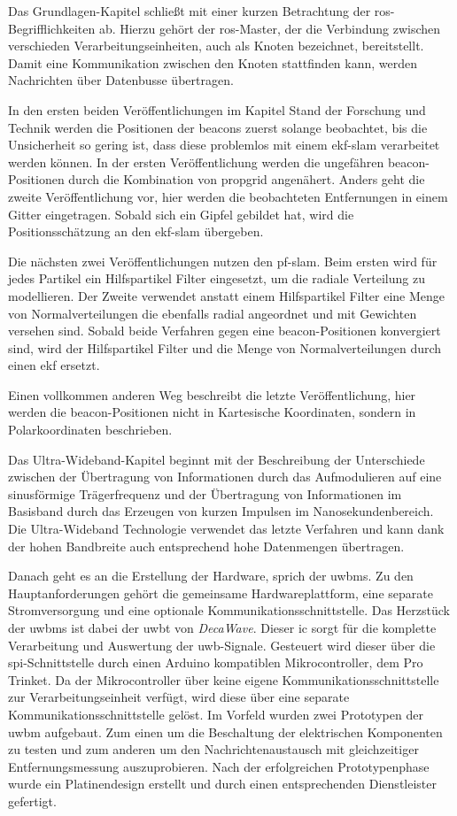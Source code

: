 Das Grundlagen-Kapitel schließt mit einer kurzen Betrachtung der \gls{ros}-Begrifflichkeiten ab. Hierzu gehört der \gls{ros}-Master, der die Verbindung zwischen verschieden Verarbeitungseinheiten, auch als Knoten bezeichnet, bereitstellt. Damit eine Kommunikation zwischen den Knoten stattfinden kann, werden Nachrichten über Datenbusse übertragen.

In den ersten beiden Veröffentlichungen im Kapitel Stand der Forschung und Technik werden die Positionen der \glspl{beacon} zuerst solange beobachtet, bis die Unsicherheit so gering ist, dass diese problemlos mit einem \gls{ekf}-\gls{slam} verarbeitet werden können. In der ersten Veröffentlichung werden die ungefähren \gls{beacon}-Positionen durch die Kombination von \gls{propgrid} angenähert. Anders geht die zweite Veröffentlichung vor, hier werden die beobachteten Entfernungen in einem Gitter eingetragen. Sobald sich ein Gipfel gebildet hat, wird die Positionsschätzung an den \gls{ekf}-\gls{slam} übergeben.

Die nächsten zwei Veröffentlichungen nutzen den \gls{pf}-\gls{slam}. Beim ersten wird für jedes Partikel ein Hilfspartikel Filter eingesetzt, um die radiale Verteilung zu modellieren. Der Zweite verwendet anstatt einem Hilfspartikel Filter eine Menge von Normalverteilungen die ebenfalls radial angeordnet und mit Gewichten versehen sind. Sobald beide Verfahren gegen eine \gls{beacon}-Positionen konvergiert sind, wird der Hilfspartikel Filter und die Menge von Normalverteilungen durch einen \gls{ekf} ersetzt.

Einen vollkommen anderen Weg beschreibt die letzte Veröffentlichung, hier werden die \gls{beacon}-Positionen nicht in Kartesische Koordinaten, sondern in Polarkoordinaten beschrieben.

Das Ultra-Wideband-Kapitel beginnt mit der Beschreibung der Unterschiede zwischen der Übertragung von Informationen durch das Aufmodulieren auf eine sinusförmige Trägerfrequenz und der Übertragung von Informationen im Basisband durch das Erzeugen von kurzen Impulsen im Nanosekundenbereich. Die Ultra-Wideband Technologie verwendet das letzte Verfahren und kann dank der hohen Bandbreite auch entsprechend hohe Datenmengen übertragen.

Danach geht es an die Erstellung der Hardware, sprich der \glspl{uwbm}. Zu den Hauptanforderungen gehört die gemeinsame Hardwareplattform, eine separate Stromversorgung und eine optionale Kommunikationsschnittstelle. Das Herzstück der \glspl{uwbm} ist dabei der \gls{uwbt} von \textit{DecaWave}. Dieser \gls{ic} sorgt für die komplette Verarbeitung und Auswertung der \gls{uwb}-Signale. Gesteuert wird dieser über die \gls{spi}-Schnittstelle durch einen Arduino kompatiblen Mikrocontroller, dem Pro Trinket. Da der Mikrocontroller über keine eigene Kommunikationsschnittstelle zur Verarbeitungseinheit verfügt, wird diese über eine separate Kommunikationsschnittstelle gelöst. Im Vorfeld wurden zwei Prototypen der \gls{uwbm} aufgebaut. Zum einen um die Beschaltung der elektrischen Komponenten zu testen und zum anderen um den Nachrichtenaustausch mit gleichzeitiger Entfernungsmessung auszuprobieren. Nach der erfolgreichen Prototypenphase wurde ein Platinendesign erstellt und durch einen entsprechenden Dienstleister gefertigt.

